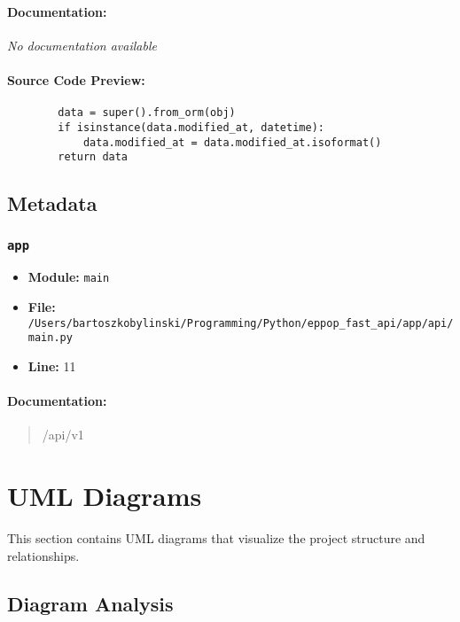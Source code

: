 \documentclass[11pt,a4paper]{article}
\begin{document}
\paragraph{Documentation:} \textit{No documentation available}

\paragraph{Source Code Preview:}
\begin{verbatim}
        data = super().from_orm(obj)
        if isinstance(data.modified_at, datetime):
            data.modified_at = data.modified_at.isoformat()
        return data
\end{verbatim}

\vspace{1em}
\subsection{Metadata}

\subsubsection{\texttt{app}}

\begin{itemize}
    \item \textbf{Module:} \texttt{main}
    \item \textbf{File:} \texttt{/Users/bartoszkobylinski/Programming/Python/eppop\_fast\_api/app/api/main.py}
    \item \textbf{Line:} 11
\end{itemize}

\paragraph{Documentation:}
\begin{quote}
/api/v1
\end{quote}


\vspace{1em}

\section{UML Diagrams}

This section contains UML diagrams that visualize the project structure and relationships.

\subsection{Diagram Analysis}
\end{document}
